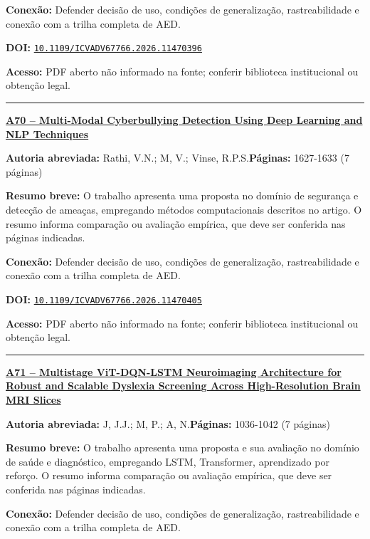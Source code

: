 \documentclass[10pt,a4paper]{article}
\begin{document}
\textbf{Conexão:} Defender decisão de uso, condições de generalização, rastreabilidade e conexão com a trilha completa de AED.\par
\textbf{DOI:} \href{https://doi.org/10.1109/ICVADV67766.2026.11470396}{\nolinkurl{10.1109/ICVADV67766.2026.11470396}}\par
\textbf{Acesso:} PDF aberto não informado na fonte; conferir biblioteca institucional ou obtenção legal.\par
\noindent\rule{\textwidth}{0.35pt}
\par\medskip\noindent
{\large\bfseries\href{https://doi.org/10.1109/ICVADV67766.2026.11470405}{A70 -- Multi-Modal Cyberbullying Detection Using Deep Learning and NLP Techniques}}\par\smallskip
\textbf{Autoria abreviada:} Rathi, V.N.; M, V.; Vinse, R.P.S.\quad \textbf{Páginas:} 1627-1633 (7 páginas)\par
\textbf{Resumo breve:} O trabalho apresenta uma proposta no domínio de segurança e detecção de ameaças, empregando métodos computacionais descritos no artigo. O resumo informa comparação ou avaliação empírica, que deve ser conferida nas páginas indicadas.\par
\textbf{Conexão:} Defender decisão de uso, condições de generalização, rastreabilidade e conexão com a trilha completa de AED.\par
\textbf{DOI:} \href{https://doi.org/10.1109/ICVADV67766.2026.11470405}{\nolinkurl{10.1109/ICVADV67766.2026.11470405}}\par
\textbf{Acesso:} PDF aberto não informado na fonte; conferir biblioteca institucional ou obtenção legal.\par
\noindent\rule{\textwidth}{0.35pt}
\par\medskip\noindent
{\large\bfseries\href{https://doi.org/10.1109/ICVADV67766.2026.11470438}{A71 -- Multistage ViT-DQN-LSTM Neuroimaging Architecture for Robust and Scalable Dyslexia Screening Across High-Resolution Brain MRI Slices}}\par\smallskip
\textbf{Autoria abreviada:} J, J.J.; M, P.; A, N.\quad \textbf{Páginas:} 1036-1042 (7 páginas)\par
\textbf{Resumo breve:} O trabalho apresenta uma proposta e sua avaliação no domínio de saúde e diagnóstico, empregando LSTM, Transformer, aprendizado por reforço. O resumo informa comparação ou avaliação empírica, que deve ser conferida nas páginas indicadas.\par
\textbf{Conexão:} Defender decisão de uso, condições de generalização, rastreabilidade e conexão com a trilha completa de AED.\par
\end{document}

